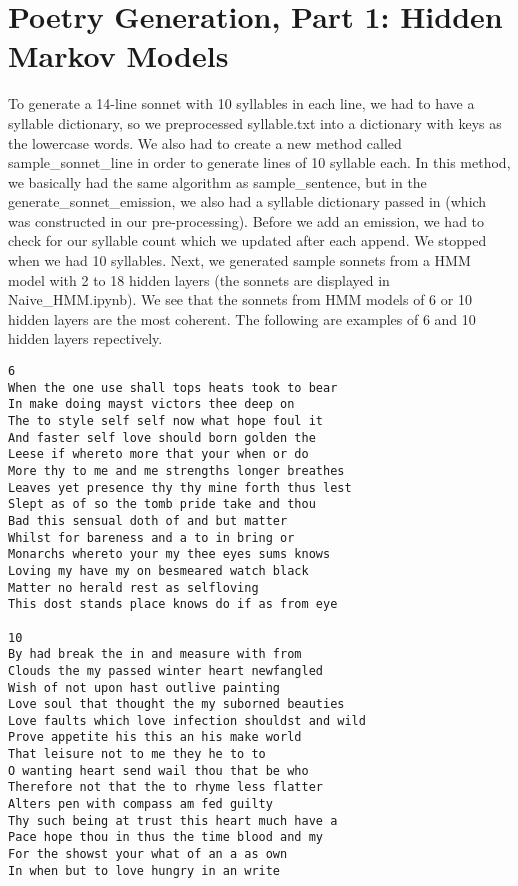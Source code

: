\section{Poetry Generation, Part 1: Hidden Markov Models}
\medskip
To generate a 14-line sonnet with 10 syllables in each line, we had to have a syllable dictionary, so we preprocessed syllable.txt into a dictionary with keys as the lowercase words. We also had to create a new method called sample_sonnet_line in order to generate lines of 10 syllable each. In this method, we basically had the same algorithm as sample_sentence, but in the generate_sonnet_emission, we also had a syllable dictionary passed in (which was constructed in our pre-processing). Before we add an emission, we had to check for our syllable count which we updated after each append. We stopped when we had 10 syllables. Next, we generated sample sonnets from a HMM model with 2 to 18 hidden layers (the sonnets are displayed in Naive_HMM.ipynb). We see that the sonnets from HMM models of 6 or 10 hidden layers are the most coherent. The following are examples of 6 and 10 hidden layers repectively. 

\begin{verbatim}
6
When the one use shall tops heats took to bear
In make doing mayst victors thee deep on
The to style self self now what hope foul it
And faster self love should born golden the
Leese if whereto more that your when or do
More thy to me and me strengths longer breathes
Leaves yet presence thy thy mine forth thus lest
Slept as of so the tomb pride take and thou
Bad this sensual doth of and but matter
Whilst for bareness and a to in bring or
Monarchs whereto your my thee eyes sums knows
Loving my have my on besmeared watch black
Matter no herald rest as selfloving
This dost stands place knows do if as from eye

10
By had break the in and measure with from
Clouds the my passed winter heart newfangled
Wish of not upon hast outlive painting
Love soul that thought the my suborned beauties
Love faults which love infection shouldst and wild
Prove appetite his this an his make world
That leisure not to me they he to to
O wanting heart send wail thou that be who
Therefore not that the to rhyme less flatter
Alters pen with compass am fed guilty
Thy such being at trust this heart much have a
Pace hope thou in thus the time blood and my
For the showst your what of an a as own
In when but to love hungry in an write
\end{verbatim}

